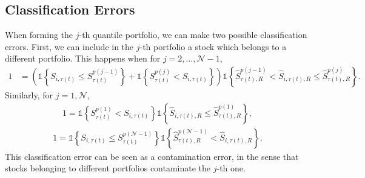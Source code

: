 \subsection{Classification Errors}

When forming the $j$-th quantile portfolio, we can make two possible classification errors. First, we can include in the $j$-th portfolio a stock which belongs to a different portfolio. This happens when for $j=2,\ldots, \mathcal{N}-1$,
\begin{align*}
	1 &=  \left( \mathds{1} \left\{ S_{i, \tau(t) } \leq S_{\tau(t) }^{p(j-1)} \right\} + \mathds{1} \left\{ S_{\tau(t)}^{p(j)} < S_{i,\tau(t) } \right\} \right) \mathds{1} \left\{ \widehat{S}_{\tau(t),R}^{p(j-1)} < \widehat{S}_{i,\tau(t),R} \leq \widehat{S}_{\tau(t),R}^{p(j)}\right\}.
\end{align*}
Similarly, for $j=1, \mathcal{N}$,
\begin{align*}
	1 = \mathds{1} \left\{ S_{\tau(t) }^{p(1)} < S_{i,\tau(t) } \right\} \mathds{1} \left\{ \widehat{S}_{i,\tau(t),R}\leq \widehat{S}_{\tau(t),R}^{p(1)}\right\},
\end{align*}
\begin{align*}
	1 = \mathds{1} \left\{ S_{i,\tau(t) } \leq S_{\tau(t) }^{p(\mathcal{N}-1)}\right\} \mathds{1} \left\{ \widehat{S}_{\tau(t),R}^{p(\mathcal{N}-1)} < \widehat{S}_{i,\tau(t),R} \right\}.
\end{align*}
This classification error can be seen as a contamination error, in the sense that stocks belonging to different portfolios contaminate the $j$-th one.


